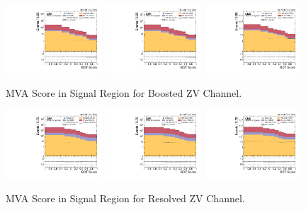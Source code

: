 \begin{figure}[!ht]
  \centering
  \includegraphics[width=0.32\textwidth]{analysis_plots/2016_zv/sr_l/mva_score_zv_var2_log.pdf}
  \includegraphics[width=0.32\textwidth]{analysis_plots/2017_zv/sr_l/mva_score_zv_var2_log.pdf}
  \includegraphics[width=0.32\textwidth]{analysis_plots/2018_zv/sr_l/mva_score_zv_var2_log.pdf} \\
  \caption[MVA Score in Signal Region for Boosted ZV Channel]%
  {MVA Score in Signal Region for Boosted ZV Channel.}%
  \label{fig:zv-sr-l-mva-score}
\end{figure}

\begin{figure}[!ht]
  \centering
  \includegraphics[width=0.32\textwidth]{analysis_plots/2016_zjj/sr_l/mva_score_zjj_var2_log.pdf}
  \includegraphics[width=0.32\textwidth]{analysis_plots/2017_zjj/sr_l/mva_score_zjj_var2_log.pdf}
  \includegraphics[width=0.32\textwidth]{analysis_plots/2018_zjj/sr_l/mva_score_zjj_var2_log.pdf} \\
  \caption[MVA Score in Signal Region for Resolved ZV Channel]%
  {MVA Score in Signal Region for Resolved ZV Channel.}%
  \label{fig:zjj-sr-l-mva-score}
\end{figure}



